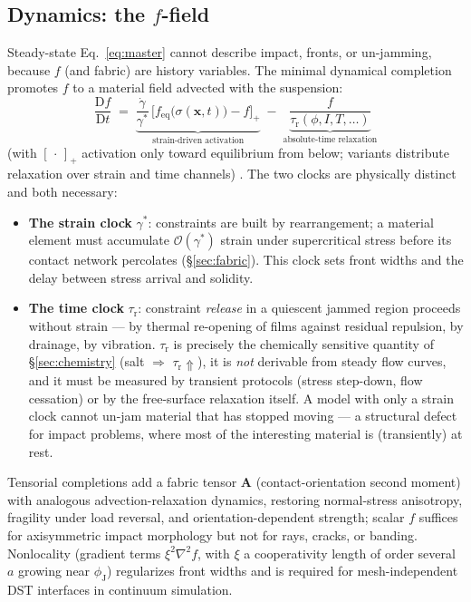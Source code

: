 \documentclass[11pt]{article}
\newcommand{\phiJ}{\phi_{\mathrm{J}}}
\newcommand{\gdot}{\dot{\gamma}}
\newcommand{\Dt}[1]{\frac{\mathrm{D}#1}{\mathrm{D}t}}
\begin{document}
\subsection{Dynamics: the $f$-field}
\label{sec:ffield}
Steady-state Eq.~\eqref{eq:master} cannot describe impact, fronts, or un-jamming, because $f$ (and fabric) are history variables. The minimal dynamical completion promotes $f$ to a material field advected with the suspension:
\begin{equation}
\boxed{\;
\Dt{f} \;=\; \underbrace{\frac{\gdot}{\gamma^{*}}\,\Big[f_{\mathrm{eq}}\big(\sigma(\mathbf{x},t)\big) - f\Big]_{+}}_{\text{strain-driven activation}}
\;-\; \underbrace{\frac{f}{\tau_{\mathrm{r}}(\phi, I, T, \ldots)}}_{\text{absolute-time relaxation}}
\;}
\label{eq:fdynamics}
\end{equation}
(with $[\,\cdot\,]_+$ activation only toward equilibrium from below; variants distribute relaxation over strain and time channels) \cite{baumgarten2019}. The two clocks are physically distinct and both necessary:
\begin{itemize}
\item \textbf{The strain clock} $\gamma^{*}$: constraints are built by rearrangement; a material element must accumulate $\mathcal{O}(\gamma^{*})$ strain under supercritical stress before its contact network percolates (\S\ref{sec:fabric}). This clock sets front widths and the delay between stress arrival and solidity.
\item \textbf{The time clock} $\tau_{\mathrm{r}}$: constraint \emph{release} in a quiescent jammed region proceeds without strain --- by thermal re-opening of films against residual repulsion, by drainage, by vibration. $\tau_{\mathrm{r}}$ is precisely the chemically sensitive quantity of \S\ref{sec:chemistry} (salt $\Rightarrow$ $\tau_{\mathrm{r}} \Uparrow$), it is \emph{not} derivable from steady flow curves, and it must be measured by transient protocols (stress step-down, flow cessation) or by the free-surface relaxation itself. A model with only a strain clock cannot un-jam material that has stopped moving --- a structural defect for impact problems, where most of the interesting material is (transiently) at rest.
\end{itemize}
Tensorial completions add a fabric tensor $\mathbf{A}$ (contact-orientation second moment) with analogous advection-relaxation dynamics, restoring normal-stress anisotropy, fragility under load reversal, and orientation-dependent strength; scalar $f$ suffices for axisymmetric impact morphology but not for rays, cracks, or banding. Nonlocality (gradient terms $\xi^2\nabla^2 f$, with $\xi$ a cooperativity length of order several $a$ growing near $\phiJ$) regularizes front widths and is required for mesh-independent DST interfaces in continuum simulation.
\end{document}
